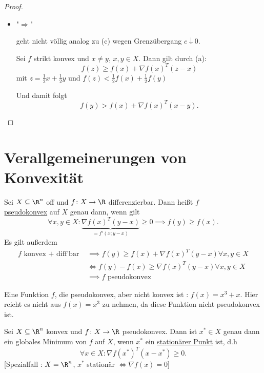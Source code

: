 \begin{proof}
\begin{itemize}[label=]
\begin{itemize}[label=]
 \item "$\Rightarrow$"

 geht nicht völlig analog zu (c) wegen Grenzübergang $c \downarrow 0$.

 Sei $f$ strikt konvex und $x\neq y$, $x,y \in X$. Dann gilt durch (a):
\[
	f(z) \geq f(x) + \nabla f(x)^{T}(z-x)
\] 
$  \text{mit }z=\frac{1}{2}x + \frac{1}{2}y \text{ und } f(z) < \frac{1}{2}f(x) + \frac{1}{2}f(y)$ 

Und damit folgt
\[
	f(y) > f(x) + \nabla f(x)^{T}(x-y)
.\] 
	\end{itemize}
\end{itemize}

\end{proof}

\section*{Verallgemeinerungen von Konvexität}
\label{sec:Verallgemeinerungen von Konvexität}

\begin{definition}
\label{thm:pseudokonvexität}
	Sei $X \subseteq \R^{n}$ off und $f \colon X \rightarrow \R $ differenzierbar. Dann heißt $f$\\
	\underline{pseudokonvex} auf $X$ genau dann, wenn gilt 
	\[
		\forall x,y \in X \colon \underbrace{\nabla f(x)^{T}(y-x)}_{=f'(x; y-x)} \geq 0 \implies f(y) \geq f(x)
	.\] 
Es gilt außerdem
\begin{align*}
	f \text{ konvex + diff'bar } & \implies f(y) \geq f(x) + \nabla f(x)^{T}(y-x) \forall x,y \in X \\
								 & \iff f(y) - f(x) \geq \nabla f(x)^{T}(y-x) \forall x,y \in X \\
								 &\implies f \text{ pseudokonvex}
\end{align*}
\end{definition}


\begin{beispiel}
\label{thm:bsppseudokonvex}
Eine Funktion $f$, die pseudokonvex, aber nicht konvex ist : $f(x) = x^{3} + x$. Hier reicht es nicht aus $f(x)=x^{3}$ zu nehmen, da diese Funktion nicht pseudokonvex ist.
\end{beispiel}

\begin{satz}
\label{thm:stationäresatz}
	Sei $X \subseteq \R^{n}$ konvex und $f \colon X \rightarrow \R $ pseudokonvex. Dann ist ${x}^{*} \in X$ genau dann ein globales Minimum von $f$ auf $X$, wenn ${x}^{*}$ ein \underline{stationärer Punkt} ist, d.h
	\[
		\forall x \in X \colon \nabla f({x}^{*})^{T}(x-{x}^{*}) \geq 0
	.\]
	[Spezialfall : $X = \R^{n}$, ${x}^{*}$ stationär $\iff \nabla f(x) = 0$]
\end{satz}


